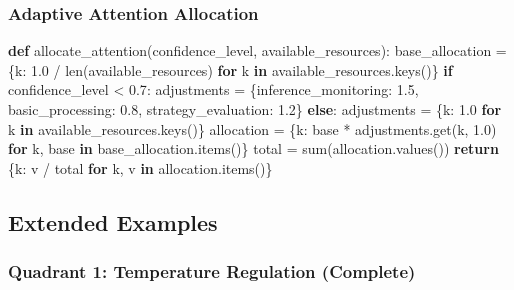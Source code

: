 \documentclass[
]{article}
\newenvironment{Shaded}{}{}
\newcommand{\BuiltInTok}[1]{\textcolor[rgb]{0.00,0.50,0.00}{#1}}
\newcommand{\ControlFlowTok}[1]{\textcolor[rgb]{0.00,0.44,0.13}{\textbf{#1}}}
\newcommand{\FloatTok}[1]{\textcolor[rgb]{0.25,0.63,0.44}{#1}}
\newcommand{\KeywordTok}[1]{\textcolor[rgb]{0.00,0.44,0.13}{\textbf{#1}}}
\newcommand{\NormalTok}[1]{#1}
\newcommand{\OperatorTok}[1]{\textcolor[rgb]{0.40,0.40,0.40}{#1}}
\newcommand{\StringTok}[1]{\textcolor[rgb]{0.25,0.44,0.63}{#1}}
\begin{document}
\subsubsection{Adaptive Attention
Allocation}\label{adaptive-attention-allocation}

\begin{Shaded}
\begin{Highlighting}[]
\KeywordTok{def}\NormalTok{ allocate\_attention(confidence\_level, available\_resources):}
\NormalTok{    base\_allocation }\OperatorTok{=}\NormalTok{ \{k: }\FloatTok{1.0} \OperatorTok{/} \BuiltInTok{len}\NormalTok{(available\_resources)}
                      \ControlFlowTok{for}\NormalTok{ k }\KeywordTok{in}\NormalTok{ available\_resources.keys()\}}
    \ControlFlowTok{if}\NormalTok{ confidence\_level }\OperatorTok{\textless{}} \FloatTok{0.7}\NormalTok{:}
\NormalTok{        adjustments }\OperatorTok{=}\NormalTok{ \{}\StringTok{\textquotesingle{}inference\_monitoring\textquotesingle{}}\NormalTok{: }\FloatTok{1.5}\NormalTok{,}
                       \StringTok{\textquotesingle{}basic\_processing\textquotesingle{}}\NormalTok{: }\FloatTok{0.8}\NormalTok{,}
                       \StringTok{\textquotesingle{}strategy\_evaluation\textquotesingle{}}\NormalTok{: }\FloatTok{1.2}\NormalTok{\}}
    \ControlFlowTok{else}\NormalTok{:}
\NormalTok{        adjustments }\OperatorTok{=}\NormalTok{ \{k: }\FloatTok{1.0} \ControlFlowTok{for}\NormalTok{ k }\KeywordTok{in}\NormalTok{ available\_resources.keys()\}}
\NormalTok{    allocation }\OperatorTok{=}\NormalTok{ \{k: base }\OperatorTok{*}\NormalTok{ adjustments.get(k, }\FloatTok{1.0}\NormalTok{)}
                 \ControlFlowTok{for}\NormalTok{ k, base }\KeywordTok{in}\NormalTok{ base\_allocation.items()\}}
\NormalTok{    total }\OperatorTok{=} \BuiltInTok{sum}\NormalTok{(allocation.values())}
    \ControlFlowTok{return}\NormalTok{ \{k: v }\OperatorTok{/}\NormalTok{ total }\ControlFlowTok{for}\NormalTok{ k, v }\KeywordTok{in}\NormalTok{ allocation.items()\}}
\end{Highlighting}
\end{Shaded}

\subsection{Extended Examples}\label{sec:extended_examples}

\subsubsection{Quadrant 1: Temperature Regulation
(Complete)}\label{quadrant-1-temperature-regulation-complete}
\end{document}
